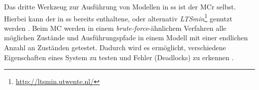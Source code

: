 Das dritte Werkzeug zur Ausführung von Modellen in \gls{ss} ist der \gls{MCr} selbst.
Hierbei kann der in \gls{ss} bereits enthaltene, oder alternativ \emph{LTSmin}\footnote{\url{http://ltsmin.utwente.nl/}} genutzt werden \cite{SSWikiModelChecking}.
Beim \gls{MC} werden in einem \emph{brute-force}-ähnlichem Verfahren alle möglichen Zustände und Ausführungspfade in einem Modell mit einer endlichen Anzahl an Zuständen getestet.
Dadurch wird es ermöglicht, verschiedene Eigenschaften eines System zu testen und Fehler (\zB Deadlocks) zu erkennen \cite{Grumberg1999}.
